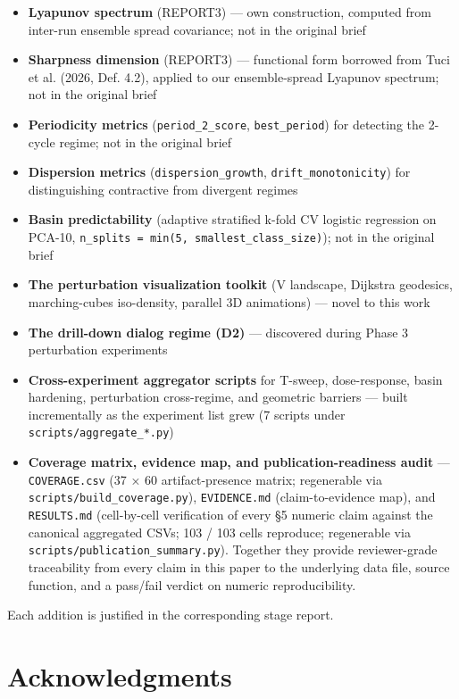 \documentclass{article}
\theoremstyle{plain}
\theoremstyle{definition}
\begin{document}
\begin{itemize}
  \item \textbf{Lyapunov spectrum} (REPORT3) — own construction, computed from
  inter-run ensemble spread covariance; not in the original brief
  \item \textbf{Sharpness dimension} (REPORT3) — functional form borrowed from
  Tuci et al. (2026, Def. 4.2), applied to our ensemble-spread Lyapunov
  spectrum; not in the original brief
  \item \textbf{Periodicity metrics} (\texttt{period\_2\_score}, \texttt{best\_period}) for
  detecting the 2-cycle regime; not in the original brief
  \item \textbf{Dispersion metrics} (\texttt{dispersion\_growth}, \texttt{drift\_monotonicity})
  for distinguishing contractive from divergent regimes
  \item \textbf{Basin predictability} (adaptive stratified k-fold CV logistic
  regression on PCA-10, \texttt{n\_splits = min(5, smallest\_class\_size)});
  not in the original brief
  \item \textbf{The perturbation visualization toolkit} (V landscape, Dijkstra
  geodesics, marching-cubes iso-density, parallel 3D animations) —
  novel to this work
  \item \textbf{The drill-down dialog regime (D2)} — discovered during Phase 3
  perturbation experiments
  \item \textbf{Cross-experiment aggregator scripts} for T-sweep, dose-response,
  basin hardening, perturbation cross-regime, and geometric barriers
  — built incrementally as the experiment list grew (7 scripts under
  \texttt{scripts/aggregate\_*.py})
  \item \textbf{Coverage matrix, evidence map, and publication-readiness audit} —
  \texttt{COVERAGE.csv} (37 × 60 artifact-presence matrix; regenerable via
  \texttt{scripts/build\_coverage.py}), \texttt{EVIDENCE.md} (claim-to-evidence map),
  and \texttt{RESULTS.md} (cell-by-cell verification of every §5 numeric
  claim against the canonical aggregated CSVs; 103 / 103 cells
  reproduce; regenerable via \texttt{scripts/publication\_summary.py}).
  Together they provide reviewer-grade traceability from every claim
  in this paper to the underlying data file, source function, and a
  pass/fail verdict on numeric reproducibility.
\end{itemize}

Each addition is justified in the corresponding stage report.


\section{Acknowledgments}
\end{document}
